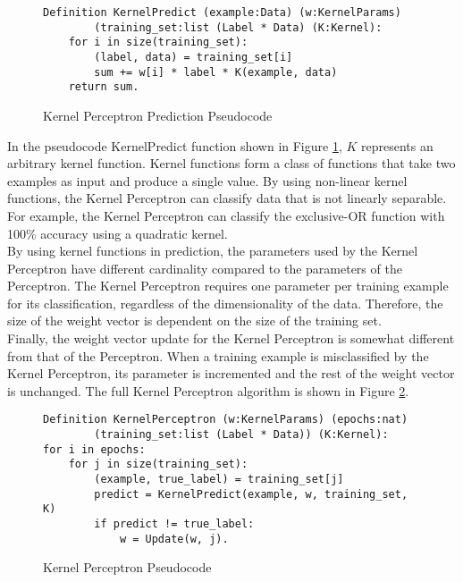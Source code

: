 \begin{figure}
    \caption{Kernel Perceptron Prediction Pseudocode}
    \label{KernelPerceptronPredictPseudo}
    \begin{lstlisting}
Definition KernelPredict (example:Data) (w:KernelParams) 
        (training_set:list (Label * Data) (K:Kernel):
    for i in size(training_set):
        (label, data) = training_set[i]
        sum += w[i] * label * K(example, data)
    return sum.
    \end{lstlisting}
\end{figure}

In the pseudocode KernelPredict function shown in Figure \ref{KernelPerceptronPredictPseudo}, $K$ represents an arbitrary kernel function. Kernel functions form a class of functions that take two examples as input and produce a single value. By using non-linear kernel functions, the Kernel Perceptron can classify data that is not linearly separable. For example, the Kernel Perceptron can classify the exclusive-OR function with 100\% accuracy
using a quadratic kernel. 
\\By using kernel functions in prediction, the parameters used by the Kernel Perceptron have different cardinality compared to the parameters of the Perceptron. The Kernel Perceptron requires one parameter per training example for its classification, regardless of the dimensionality of the data. Therefore, the size of the weight vector is dependent on the size of the training set. 
\\Finally, the weight vector update for the Kernel Perceptron is somewhat different from that of the Perceptron. When a training example is misclassified by the Kernel Perceptron, its parameter is incremented and the rest of the weight vector is unchanged. The full Kernel Perceptron algorithm is shown in Figure \ref{KernelPerceptronPseodo}.

\begin{figure}
    \caption{Kernel Perceptron Pseudocode}
    \label{KernelPerceptronPseodo}
    \begin{lstlisting}
Definition KernelPerceptron (w:KernelParams) (epochs:nat)
        (training_set:list (Label * Data)) (K:Kernel):
for i in epochs:
    for j in size(training_set):
        (example, true_label) = training_set[j]
        predict = KernelPredict(example, w, training_set, K)
        if predict != true_label:
            w = Update(w, j).
    \end{lstlisting}
\end{figure}

